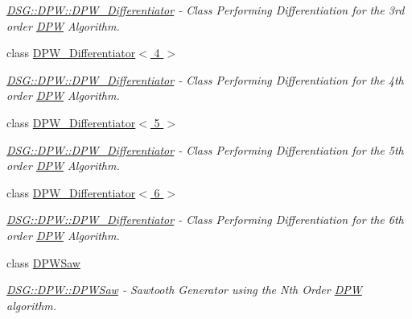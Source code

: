 \begin{DoxyCompactItemize}
\begin{DoxyCompactList}\small\item\em \hyperlink{class_d_s_g_1_1_d_p_w_1_1_d_p_w___differentiator}{D\+S\+G\+::\+D\+P\+W\+::\+D\+P\+W\+\_\+\+Differentiator} -\/ Class Performing Differentiation for the 3rd order \hyperlink{namespace_d_s_g_1_1_d_p_w}{D\+P\+W} Algorithm. \end{DoxyCompactList}\item 
class \hyperlink{class_d_s_g_1_1_d_p_w_1_1_d_p_w___differentiator_3_014_01_4}{D\+P\+W\+\_\+\+Differentiator$<$ 4 $>$}
\begin{DoxyCompactList}\small\item\em \hyperlink{class_d_s_g_1_1_d_p_w_1_1_d_p_w___differentiator}{D\+S\+G\+::\+D\+P\+W\+::\+D\+P\+W\+\_\+\+Differentiator} -\/ Class Performing Differentiation for the 4th order \hyperlink{namespace_d_s_g_1_1_d_p_w}{D\+P\+W} Algorithm. \end{DoxyCompactList}\item 
class \hyperlink{class_d_s_g_1_1_d_p_w_1_1_d_p_w___differentiator_3_015_01_4}{D\+P\+W\+\_\+\+Differentiator$<$ 5 $>$}
\begin{DoxyCompactList}\small\item\em \hyperlink{class_d_s_g_1_1_d_p_w_1_1_d_p_w___differentiator}{D\+S\+G\+::\+D\+P\+W\+::\+D\+P\+W\+\_\+\+Differentiator} -\/ Class Performing Differentiation for the 5th order \hyperlink{namespace_d_s_g_1_1_d_p_w}{D\+P\+W} Algorithm. \end{DoxyCompactList}\item 
class \hyperlink{class_d_s_g_1_1_d_p_w_1_1_d_p_w___differentiator_3_016_01_4}{D\+P\+W\+\_\+\+Differentiator$<$ 6 $>$}
\begin{DoxyCompactList}\small\item\em \hyperlink{class_d_s_g_1_1_d_p_w_1_1_d_p_w___differentiator}{D\+S\+G\+::\+D\+P\+W\+::\+D\+P\+W\+\_\+\+Differentiator} -\/ Class Performing Differentiation for the 6th order \hyperlink{namespace_d_s_g_1_1_d_p_w}{D\+P\+W} Algorithm. \end{DoxyCompactList}\item 
class \hyperlink{class_d_s_g_1_1_d_p_w_1_1_d_p_w_saw}{D\+P\+W\+Saw}
\begin{DoxyCompactList}\small\item\em \hyperlink{class_d_s_g_1_1_d_p_w_1_1_d_p_w_saw}{D\+S\+G\+::\+D\+P\+W\+::\+D\+P\+W\+Saw} -\/ Sawtooth Generator using the Nth Order \hyperlink{namespace_d_s_g_1_1_d_p_w}{D\+P\+W} algorithm. \end{DoxyCompactList}\end{DoxyCompactItemize}
